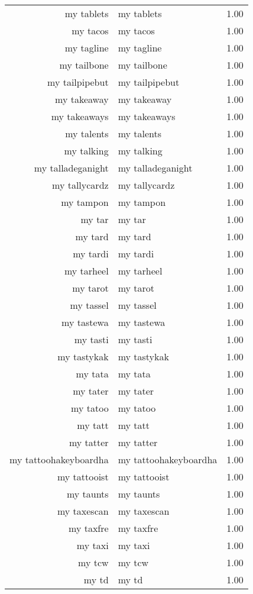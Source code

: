\begin{table}[ht]
\begin{tabular}{rlr}
  my tablets & my tablets & 1.00 \\ 
  my tacos & my tacos & 1.00 \\ 
  my tagline & my tagline & 1.00 \\ 
  my tailbone & my tailbone & 1.00 \\ 
  my tailpipebut & my tailpipebut & 1.00 \\ 
  my takeaway & my takeaway & 1.00 \\ 
  my takeaways & my takeaways & 1.00 \\ 
  my talents & my talents & 1.00 \\ 
  my talking & my talking & 1.00 \\ 
  my talladeganight & my talladeganight & 1.00 \\ 
  my tallycardz & my tallycardz & 1.00 \\ 
  my tampon & my tampon & 1.00 \\ 
  my tar & my tar & 1.00 \\ 
  my tard & my tard & 1.00 \\ 
  my tardi & my tardi & 1.00 \\ 
  my tarheel & my tarheel & 1.00 \\ 
  my tarot & my tarot & 1.00 \\ 
  my tassel & my tassel & 1.00 \\ 
  my tastewa & my tastewa & 1.00 \\ 
  my tasti & my tasti & 1.00 \\ 
  my tastykak & my tastykak & 1.00 \\ 
  my tata & my tata & 1.00 \\ 
  my tater & my tater & 1.00 \\ 
  my tatoo & my tatoo & 1.00 \\ 
  my tatt & my tatt & 1.00 \\ 
  my tatter & my tatter & 1.00 \\ 
  my tattoohakeyboardha & my tattoohakeyboardha & 1.00 \\ 
  my tattooist & my tattooist & 1.00 \\ 
  my taunts & my taunts & 1.00 \\ 
  my taxescan & my taxescan & 1.00 \\ 
  my taxfre & my taxfre & 1.00 \\ 
  my taxi & my taxi & 1.00 \\ 
  my tcw & my tcw & 1.00 \\ 
  my td & my td & 1.00 \\ 

\end{tabular}
\end{table}
